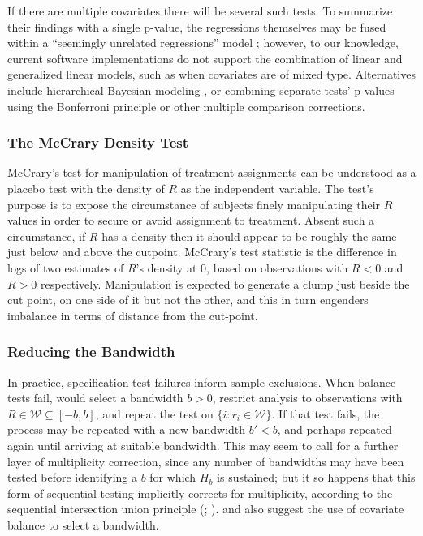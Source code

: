 If there are multiple
covariates there will be several such tests. To summarize their
findings with a single p-value, the
regressions themselves may be fused within a
``seemingly unrelated regressions'' model \citep{lee2010regression};
however, to our knowledge, current software implementations do not
support the combination of linear and generalized linear
models, such as when covariates are of mixed type.
Alternatives include hierarchical Bayesian modeling
\citep{liMatteiMealli2015BayesianRD}, or combining
separate tests' p-values using the Bonferroni principle or
other multiple comparison corrections.

\subsubsection{The McCrary Density Test}\label{sec:mccrary}
McCrary's test for manipulation of treatment assignments
\citeyearpar{mccrary2008manipulation} can be understood as a %
placebo test with the density of $R$ as the independent variable.
The test's
purpose is to expose the circumstance of subjects finely manipulating their
$R$ values in order to secure or avoid assignment to treatment.  Absent
such a circumstance, if $R$ has a density then it should appear to be
roughly the same just below and above the cutpoint.  McCrary's
\citeyearpar{mccrary2008manipulation} test statistic is the difference
in logs of two estimates of $R$'s density at 0, based on observations
with $R<0$ and $R>0$ respectively.
Manipulation is expected to generate a clump just beside the cut
point, on one side of it but not the other, and this in turn engenders
imbalance in terms of distance from the cut-point.

\subsubsection{Reducing the Bandwidth}\label{sec:bandwidth}
In practice, specification test failures inform sample exclusions.
When balance tests fail,
\citet{lee2010regression} would select a bandwidth $b>0$, restrict
analysis to observations with $R\in \mathcal{W} \subseteq [-b, b]$,
and repeat the test on $\{i : r_{i} \in \mathcal{W}\}$.
If that test fails, the process may be repeated with a new bandwidth
$b'<b$, and perhaps repeated again until arriving at suitable bandwidth.
This may seem to call for a further layer of multiplicity correction,
since any number of
bandwidths may have been tested before identifying a
$b$ for which $H_{b}$ is sustained; but it so happens that this form
of sequential testing implicitly corrects for multiplicity, according to the
sequential intersection union principle
(\citealp[SIUP;][Proposition~1]{rosenbaum2008testing};
\citealp{hansenSales2015cochran}).
\citet{liMatteiMealli2015BayesianRD} and
\citet{cattaneo2014randomization} also suggest the use of covariate
balance to select a bandwidth.

